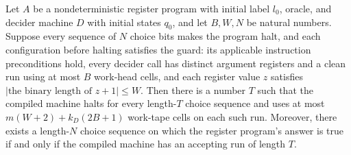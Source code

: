 \begin{theorem}
\label{Complexity.LogProg.narm_space}
\leanok
{}
Let $A$ be a nondeterministic register program with initial label $l_0$, oracle, and
decider machine $D$ with initial states $q_0$, and let $B,W,N$ be natural numbers.
Suppose every sequence of $N$ choice bits makes the program halt, and each configuration
before halting satisfies the guard: its applicable instruction preconditions hold, every
decider call has distinct argument registers and a clean run using at most $B$ work-head
cells, and each register value $z$ satisfies $|\text{the binary length of }z+1|\le W$.
Then there is a number $T$ such that the compiled machine halts for every length-$T$
choice sequence and uses at most $m(W+2)+k_D(2B+1)$ work-tape cells on each such run.
Moreover, there exists a length-$N$ choice sequence on which the register program's
answer is true if and only if the compiled machine has an accepting run of length $T$.
\end{theorem}
